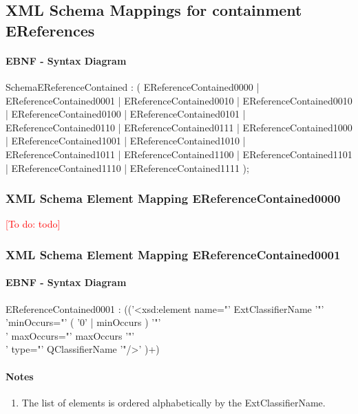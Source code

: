 \documentclass[11pt,a4paper]{article}
\newcommand{\addtodo}[1]{\textcolor{red}{[To do: #1]}\index{TODO: #1}}
\begin{document}
\subsection{XML Schema Mappings for containment EReferences}
\paragraph{EBNF - Syntax Diagram}
\begin{rail}
SchemaEReferenceContained : ( EReferenceContained0000 | EReferenceContained0001  | EReferenceContained0010 | EReferenceContained0010 | EReferenceContained0100 | EReferenceContained0101 | EReferenceContained0110 | EReferenceContained0111 | EReferenceContained1000 | EReferenceContained1001 | EReferenceContained1010 | EReferenceContained1011 | EReferenceContained1100 | EReferenceContained1101 | EReferenceContained1110 | EReferenceContained1111 );
\end{rail}



\subsubsection{XML Schema Element Mapping EReferenceContained0000}
\addtodo{todo}


\subsubsection{XML Schema Element Mapping EReferenceContained0001}
\paragraph{EBNF - Syntax Diagram}
\begin{rail}
EReferenceContained0001 :
(('<xsd:element name="' ExtClassifierName '"'\\
    'minOccurs="' ( '0' | minOccurs ) '"'\\
    ' maxOccurs="' maxOccurs '"'\\
    ' type="' QClassifierName '"/>' )+)
\end{rail}

\paragraph{Notes}
\begin{enumerate}
\item The list of elements is ordered alphabetically by the ExtClassifierName. 
\end{enumerate}
\end{document}
